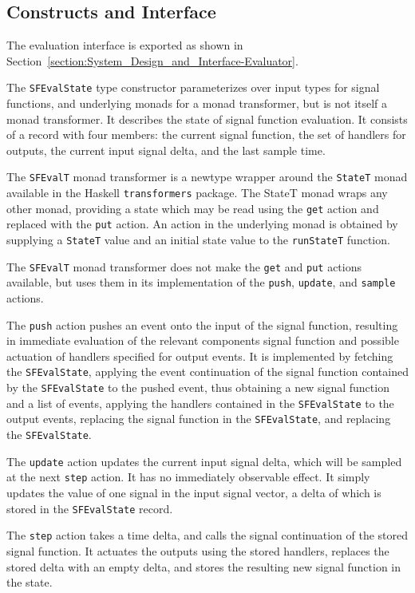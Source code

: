 \subsection{Constructs and Interface}
\label{section:Implementation-Evaluation_Interface-Constructs_and_Interface}

The evaluation interface is exported as shown in
Section~\ref{section:System_Design_and_Interface-Evaluator}.

The {\tt SFEvalState} type constructor parameterizes over input types for signal
functions, and underlying monads for a monad transformer, but is not itself
a monad transformer. It describes the state of signal function evaluation.
It consists of a record with four members: the current signal function,
the set of handlers for outputs, the current input signal delta, and the last
sample time.

The {\tt SFEvalT} monad transformer is a newtype wrapper around the {\tt StateT}
monad available in the Haskell {\tt transformers} package. The StateT monad
wraps any other monad, providing a state which may be read using the {\tt get}
action and replaced with the {\tt put} action. An action in the underlying
monad is obtained by supplying a {\tt StateT} value and an initial state
value to the {\tt runStateT} function.

The {\tt SFEvalT} monad transformer does not make the {\tt get} and {\tt put}
actions available, but uses them in its implementation of the {\tt push},
{\tt update}, and {\tt sample} actions.

The {\tt push} action pushes an event onto the input of the signal function,
resulting in immediate evaluation of the relevant components signal function
and possible actuation of handlers specified for output events. It is
implemented by fetching the {\tt SFEvalState}, applying the event continuation
of the signal function contained by the {\tt SFEvalState} to the pushed event,
thus obtaining a new signal function and a list of events, applying the handlers
contained in the {\tt SFEvalState} to the output events, replacing the signal
function in the {\tt SFEvalState}, and replacing the {\tt SFEvalState}.

The {\tt update} action updates the current input signal delta, which will be
sampled at the next {\tt step} action. It has no immediately observable effect.
It simply updates the value of one signal in the input signal vector, a delta
of which is stored in the {\tt SFEvalState} record.

The {\tt step} action takes a time delta, and calls the signal continuation of
the stored signal function. It actuates the outputs using the stored handlers,
replaces the stored delta with an empty delta, and stores the resulting new
signal function in the state.
